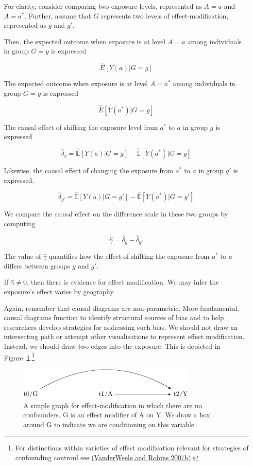 \documentclass[
  singlecolumn]{article}
\begin{document}
For clarity, consider comparing two exposure levels, represented as
\(A = a\) and \(A= a^*\). Further, assume that \(G\) represents two
levels of effect-modification, represented as \(g\) and \(g'\).

Then, the expected outcome when exposure is at level \(A=a\) among
individuals in group \(G=g\) is expressed

\[\hat{E}[Y(a)|G=g]\]

The expected outcome when exposure is at level \(A=a^*\) among
individuals in group \(G=g\) is expressed

\[\hat{E}[Y(a^*)|G=g]\]

The causal effect of shifting the exposure level from \(a^*\) to \(a\)
in group \(g\) is expressed

\[\hat{\delta}_g = \hat{\mathbb{E}}[Y(a)|G=g] - \hat{\mathbb{E}}[Y(a^*)|G=g]\]

Likewise, the causal effect of changing the exposure from \(a^*\) to
\(a\) in group \(g'\) is expressed.

\[\hat{\delta}_{g'} = \hat{\mathbb{E}}[Y(a)|G=g'] - \hat{\mathbb{E}}[Y(a^*)|G=g']\]

We compare the causal effect on the difference scale in these two groups
by computing

\[\hat{\gamma} = \hat{\delta}_g - \hat{\delta}_{g'}\]

The value of \(\hat{\gamma}\) quantifies how the effect of shifting the
exposure from \(a^*\) to \(a\) differs between groups \(g\) and \(g'\).

If \(\hat{\gamma}\neq 0\), then there is evidence for effect
modification. We may infer the exposure's effect varies by geography.

Again, remember that causal diagrams are non-parametric. More
fundamental, causal diagrams function to identify structural sources of
bias and to help researchers develop strategies for addressing such
bias. We should not draw an intersecting path or attempt other
visualisations to represent effect modification. Instead, we should draw
two edges into the exposure. This is depicted in
Figure~\ref{fig-dag-effect-modfication}.\footnote{For distinctions
  within varieties of effect modification relevant for strategies of
  confounding controul see
  (\protect\hyperlink{ref-vanderweele2007}{VanderWeele and Robins
  2007b}).}

\begin{figure}

{\centering \includegraphics[width=0.8\textwidth,height=\textheight]{causal-dags_files/figure-pdf/fig-dag-effect-modfication-1.pdf}

}

\caption{\label{fig-dag-effect-modfication}A simple graph for
effect-modification in which there are no confounders. G is an effect
modifier of A on Y. We draw a box around G to indicate we are
conditioning on this variable.}

\end{figure}
\end{document}
